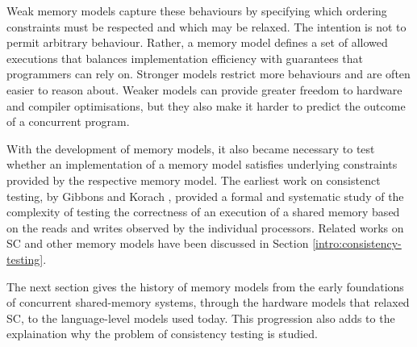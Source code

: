 Weak memory models capture these behaviours by specifying which ordering constraints must be respected and which may be relaxed. The intention is not to permit arbitrary behaviour. Rather, a memory model defines a set of allowed executions that balances implementation efficiency with guarantees that programmers can rely on. Stronger models restrict more behaviours and are often easier to reason about. Weaker models can provide greater freedom to hardware and compiler optimisations, but they also make it harder to predict the outcome of a concurrent program.

With the development of memory models, it also became necessary to test whether an implementation of a memory model satisfies underlying constraints provided by the respective memory model. The earliest work on consistenct testing, by Gibbons and Korach \cite{Gibbons}, provided a formal and systematic study of the complexity of testing the correctness of an execution of a shared memory based on the reads and writes observed by the individual processors. Related works on SC and other memory models have been discussed in Section \ref{intro:consistency-testing}. 

The next section gives the history of memory models from the early  foundations of concurrent shared-memory systems, through the hardware models that relaxed SC, to the language-level models used today. This progression also adds to  the explaination why the problem of consistency testing is studied. 






